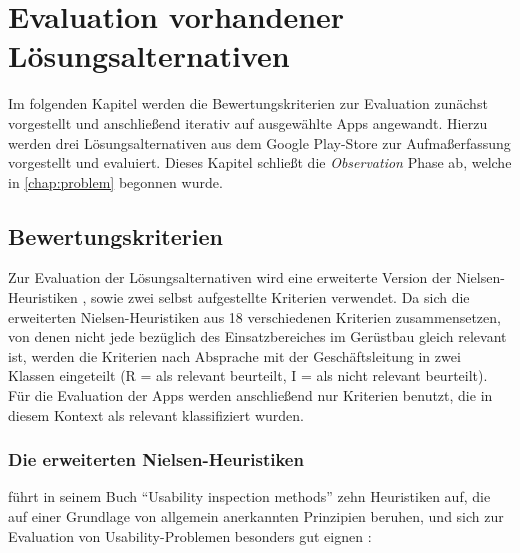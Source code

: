 \chapter{Evaluation vorhandener Lösungsalternativen}\label{chap:eval}
Im folgenden Kapitel werden die Bewertungskriterien zur Evaluation zunächst vorgestellt und anschließend iterativ auf ausgewählte Apps angewandt.
Hierzu werden drei Lösungsalternativen aus dem Google Play-Store zur Aufmaßerfassung vorgestellt und evaluiert.
Dieses Kapitel schließt die \emph{Observation} Phase ab, welche in \autoref{chap:problem} begonnen wurde. 

\section{Bewertungskriterien}\label{sec:criteria}
Zur Evaluation der Lösungsalternativen wird eine erweiterte Version der Nielsen-Heuristiken \citep{Nielsen94}, sowie zwei selbst aufgestellte Kriterien verwendet. 
Da sich die erweiterten Nielsen-Heuristiken aus 18 verschiedenen Kriterien zusammensetzen, von denen nicht jede bezüglich des Einsatzbereiches im Gerüstbau gleich relevant ist, werden die Kriterien nach Absprache mit der Geschäftsleitung in zwei Klassen eingeteilt (R = als relevant beurteilt, I = als nicht relevant beurteilt).
Für die Evaluation der Apps werden anschließend nur Kriterien benutzt, die in diesem Kontext als relevant klassifiziert wurden.

\subsection{Die erweiterten Nielsen-Heuristiken}\label{subsec:nielsen}
\citeauthor{Nielsen94} führt in seinem Buch ``Usability inspection methods'' zehn Heuristiken auf, die auf einer Grundlage von allgemein anerkannten Prinzipien beruhen, und sich zur Evaluation von Usability-Problemen besonders gut eignen \citep[Seite 25--62]{Nielsen94}: 

\begin{enumerate}
\end{enumerate} 

